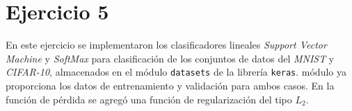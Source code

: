 

    

\section*{Ejercicio 5}

En este ejercicio se implementaron los clasificadores lineales \emph{Support Vector Machine} y \emph{SoftMax} para clasificación de los conjuntos de datos del \emph{MNIST} y \emph{CIFAR-10}, almacenados en el módulo \verb|datasets| de la librería \verb|keras|.  módulo ya proporciona los datos de entrenamiento y validación para ambos casos. En la función de pérdida se agregó una función de regularización del tipo $L_2$.

